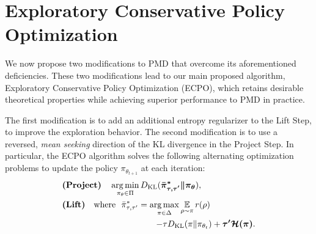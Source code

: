 

\section{Exploratory Conservative Policy Optimization}
\label{subsec:ECPO}

We now propose two modifications to PMD that overcome 
its aforementioned deficiencies.
These two modifications lead to our main proposed algorithm,
Exploratory Conservative Policy Optimization (ECPO),
which retains desirable theoretical properties while achieving superior performance to PMD in practice.

The first modification is to add an additional entropy regularizer
to the Lift Step,
to improve the exploration behavior. %
The second modification is to use a reversed, \emph{mean seeking} direction
of the KL divergence in the Project Step.
In particular, the ECPO algorithm solves the following 
alternating
optimization problems to update the policy $\pi_{\theta_{t+1}}$
at each iteration:
%
{\small
\begin{equation}
\label{eq:ECPO}
\begin{split}
&\text{\bf (Project)} \quad  \argmin\limits_{\pi_\theta \in \Pi}{\KL(\bm{ \bar{\pi}_{\tau,\tau^{\prime}}^* \| \pi_\theta }) }, \\
&\text{\bf (Lift)} \quad \text{where}\ \ \bar{\pi}_{\tau,\tau^{\prime}}^*  =  \argmax\limits_{\pi \in \Delta}{ \ep\limits_{\rho \sim \pi}{  r(\rho) }} \\
&\qquad \qquad \qquad \qquad \qquad \quad {{ - \tau \KL(\pi \| \pi_{\theta_t}) + \bm{\tau^{\prime} \cH(\pi)} }}.
\end{split}
\end{equation}
}
%

